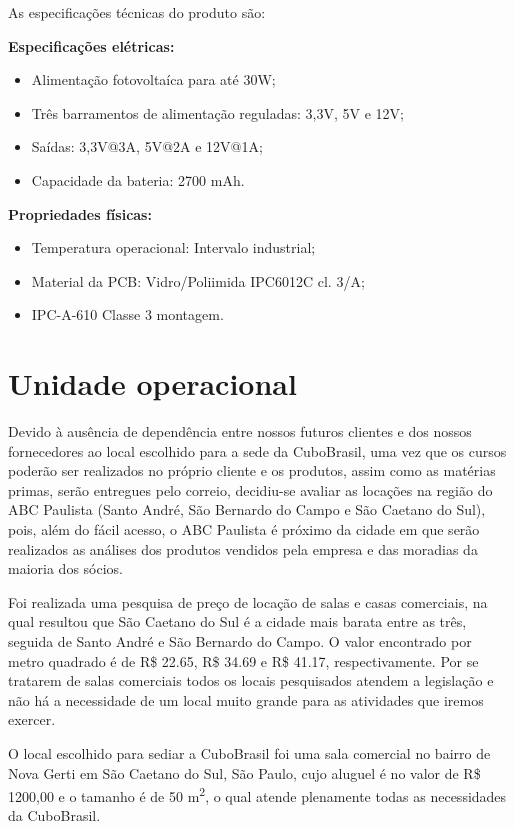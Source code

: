 \documentclass[
	12pt,				%
	openright,			%
	oneside,			%
	a4paper,			%
	english,			%
	french,				%
	spanish,			%
	brazil				%
	]{abntex2}
\begin{document}
	As especificações técnicas do produto são:
	
	\textbf{Especificações elétricas:}
	
	\begin{itemize}
		\item Alimentação fotovoltaíca para até 30W;
		\item Três barramentos de alimentação reguladas: 3,3V, 5V e 12V;
		\item Saídas: 3,3V@3A, 5V@2A e 12V@1A;
		\item Capacidade da bateria: 2700 mAh.
	\end{itemize}
	
	\textbf{Propriedades físicas:}
	
	\begin{itemize}
		\item Temperatura operacional: Intervalo industrial;
		\item Material da PCB: Vidro/Poliimida IPC6012C cl. 3/A;
		\item IPC-A-610 Classe 3 montagem.
	\end{itemize}
	
\section[Unidade operacional]{Unidade operacional}
	
	Devido à ausência de dependência entre nossos futuros clientes e dos nossos fornecedores ao local escolhido para a sede da CuboBrasil, uma vez que os cursos poderão ser realizados no próprio cliente e os produtos, assim como as matérias primas, serão entregues pelo correio, decidiu-se avaliar as locações na região do ABC Paulista (Santo André, São Bernardo do Campo e São Caetano do Sul), pois, além do fácil acesso, o ABC Paulista é próximo da cidade em que serão realizados as análises dos produtos vendidos pela empresa e das moradias da maioria dos sócios.
	
	Foi realizada uma pesquisa de preço de locação de salas e casas comerciais, na qual resultou que São Caetano do Sul é a cidade mais barata entre as três, seguida de Santo André e São Bernardo do Campo. O valor encontrado por metro quadrado é de R\$ 22.65, R\$ 34.69 e R\$ 41.17, respectivamente. Por se tratarem de salas comerciais todos os locais pesquisados atendem a legislação e não há a necessidade de um local muito grande para as atividades que iremos exercer.
	
	O local escolhido para sediar a CuboBrasil foi uma sala comercial no bairro de Nova Gerti em São Caetano do Sul, São Paulo, cujo aluguel é no valor de R\$ 1200,00 e o tamanho é de 50 m\textsuperscript{2}, o qual atende plenamente todas as necessidades da CuboBrasil. 
	
\end{document}
